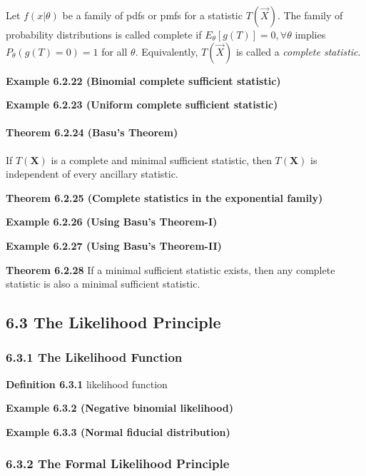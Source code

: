 \documentclass[6pt,twocolumn,Portrait]{article}
\let\oldparagraph\paragraph
\renewcommand{\paragraph}[1]{\oldparagraph{#1}\mbox{}}
\begin{document}
Let \(f(x|\theta)\) be a family of pdfs or pmfs for a statistic
\(T(\vec X)\). The family of probability distributions is called
complete if \(E_\theta[g(T)]=0, \forall\theta\) implies
\(P_\theta(g(T)=0)=1\) for all \(\theta\). Equivalently, \(T(\vec X)\)
is called a \emph{complete statistic}.

\textbf{Example 6.2.22 (Binomial complete sufficient statistic)}

\textbf{Example 6.2.23 (Uniform complete sufficient statistic)}

\hypertarget{Basu}{%
\paragraph{\texorpdfstring{\textbf{Theorem 6.2.24 (Basu's
Theorem)}}{Theorem 6.2.24 (Basu's Theorem)}}\label{Basu}}

If \(T(\mathbf{X})\) is a complete and minimal sufficient statistic,
then \(T(\mathbf{X})\) is independent of every ancillary statistic.

\textbf{Theorem 6.2.25 (Complete statistics in the exponential family)}

\textbf{Example 6.2.26 (Using Basu's Theorem-I)}

\textbf{Example 6.2.27 (Using Basu's Theorem-II)}

\textbf{Theorem 6.2.28} If a minimal sufficient statistic exists, then
any complete statistic is also a minimal sufficient statistic.

\hypertarget{the-likelihood-principle}{%
\subsection{6.3 The Likelihood
Principle}\label{the-likelihood-principle}}

\hypertarget{the-likelihood-function}{%
\subsubsection{6.3.1 The Likelihood
Function}\label{the-likelihood-function}}

\textbf{Definition 6.3.1} likelihood function

\textbf{Example 6.3.2 (Negative binomial likelihood)}

\textbf{Example 6.3.3 (Normal fiducial distribution)}

\hypertarget{the-formal-likelihood-principle}{%
\subsubsection{6.3.2 The Formal Likelihood
Principle}\label{the-formal-likelihood-principle}}
\end{document}
